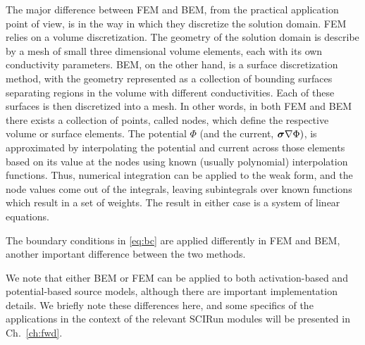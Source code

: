 The major difference between FEM and BEM, from the practical application point of view,
is in the way in which they discretize the solution domain.
FEM relies on a volume discretization. The geometry of the solution domain
is describe by a mesh of small three dimensional volume elements,
each with its own conductivity parameters.
BEM, on the other hand, is a surface discretization
method, with the geometry represented as a collection of bounding surfaces
separating regions in the volume with different conductivities. Each of
these surfaces is then discretized into a mesh. In other words, in both FEM
and BEM there exists a collection of points, called nodes, which define the
respective volume or surface elements. The potential $\Phi$ (and the
current, $\mbox{\boldmath $\sigma$} \nabla \Phi)$, is approximated by interpolating the
potential and current across those elements based on its value at the
nodes using known (usually polynomial) interpolation functions. Thus,
numerical integration can be applied to the weak form, and the node values
come out of the integrals, leaving subintegrals over known functions which
result in a set of weights. The result in either case is a system of
linear equations.

The boundary conditions in \autoref{eq:bc} are applied differently  in FEM
and BEM, another important difference between the two methods.



We note that either BEM or FEM can be applied to both activation-based and
potential-based source models, although there are important implementation
details. We briefly note these differences here, and some specifics of the
applications in the context of the relevant SCIRun modules will be
presented in Ch.~\ref{ch:fwd}.



